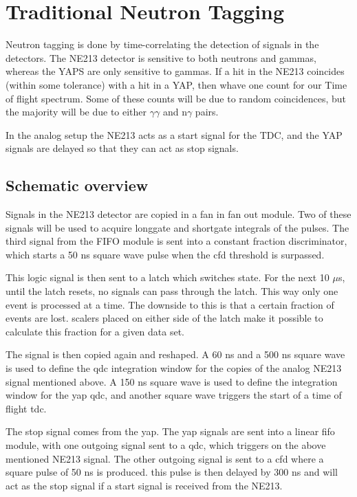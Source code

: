 \documentclass[main.tex]{subfiles}
\begin{document}
\section{Traditional Neutron Tagging}
Neutron tagging is done by time-correlating the detection of signals in the detectors. The NE213 detector is sensitive to both neutrons and gammas, whereas the YAPS are only sensitive to gammas. If a hit in the NE213 coincides (within some tolerance) with a hit in a YAP, then whave one count for our Time of flight spectrum. Some of these counts will be due to random coincidences, but the majority will be due to either $\gamma\gamma$ and n$\gamma$ pairs.

In the analog setup the NE213 acts as a start signal for the TDC, and the YAP signals are delayed so that they can act as stop signals.

\subsection{Schematic overview}
Signals in the NE213 detector are copied in a fan in fan out module. Two of these signals will be used to acquire longgate and shortgate integrals of the pulses. The third signal from the FIFO module is sent into a constant fraction discriminator, which starts a 50 ns square wave pulse when the cfd threshold is surpassed. 


This logic signal is then sent to a latch which switches state. For the next 10 $\mu$s, until the latch resets, no signals can pass through the latch. This way only one event is processed at a time. The downside to this is that a certain fraction of events are lost. scalers placed on either side of the latch make it possible to calculate this fraction for a given data set.

The signal is then copied again and reshaped. A 60 ns and a 500 ns square wave is used to define the qdc integration window for the copies of the analog NE213 signal mentioned above. A 150 ns square wave is used to define the integration window for the yap qdc, and another square wave triggers the start of a time of flight tdc.

The stop signal comes from the yap. The yap signals are sent into a linear fifo module, with one outgoing signal sent to a qdc, which triggers on the above mentioned NE213 signal. %
The other outgoing signal is sent to a cfd where a square pulse of 50 ns is produced. this pulse is then delayed by 300 ns and will act as the stop signal if a start signal is received from the NE213. %
\end{document}
